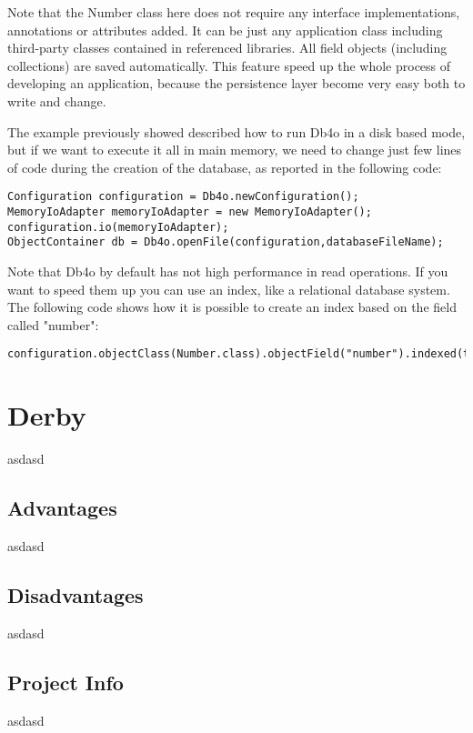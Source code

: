 Note that the Number class here does not require any interface implementations, annotations or attributes added. It can be just any application class including third-party classes contained in referenced libraries. All field objects (including collections) are saved automatically. This feature speed up the whole process of developing an application, because the persistence layer become very easy both to write and change.

The example previously showed described how to run Db4o in a disk based mode, but if we want to execute it all in main memory, we need to change just few lines of code during the creation of the database, as reported in the following code:

\begin{lstlisting}
Configuration configuration = Db4o.newConfiguration();
MemoryIoAdapter memoryIoAdapter = new MemoryIoAdapter();
configuration.io(memoryIoAdapter);
ObjectContainer db = Db4o.openFile(configuration,databaseFileName);
\end{lstlisting}
				
Note that Db4o by default has not high performance in read operations. If you want to speed them up you can use an index, like a relational database system. The following code shows how it is possible to create an index based on the field called "number":
		
\begin{lstlisting}
configuration.objectClass(Number.class).objectField("number").indexed(true);
\end{lstlisting}		
		
		\section{Derby}
		asdasd

		
			\subsection{Advantages}
asdasd
			
			\subsection{Disadvantages}
asdasd
			
			\subsection{Project Info}
asdasd
		

